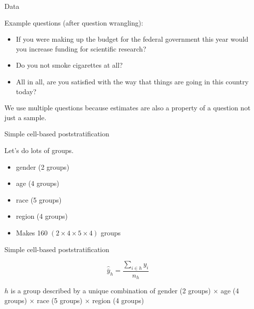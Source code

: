\documentclass[aspectratio=169]{beamer}
\begin{document}
\begin{frame}{Data}

Example questions (after question wrangling):
\begin{itemize}
\item If you were making up the budget for the federal government this year would you increase funding for scientific research?\pause
\item Do you not smoke cigarettes at all? \pause
\item All in all, are you satisfied with the way that things are going in this country today? \pause
\end{itemize}

\vfill
We use multiple questions because estimates are also a property of a question not just a sample.

\end{frame}
\begin{frame}{Simple cell-based poststratification}

Let's do lots of groups.
\begin{itemize}
\item gender (2 groups)
\item age (4 groups)
\item race (5 groups)
\item region (4 groups)
\item Makes 160 $(2 \times 4 \times 5 \times 4)$ groups
\end{itemize}

\end{frame}
\begin{frame}{Simple cell-based poststratification}

\begin{equation*}
\hat{\bar{y}}_h = \frac{\sum_{i \in h} y_i}{n_h}
\end{equation*}

\vfill
$h$ is a group described by a unique combination of gender (2 groups) $\times$ age (4 groups) $\times$ race (5 groups) $\times$ region (4 groups) 

\end{frame}
\end{document}
